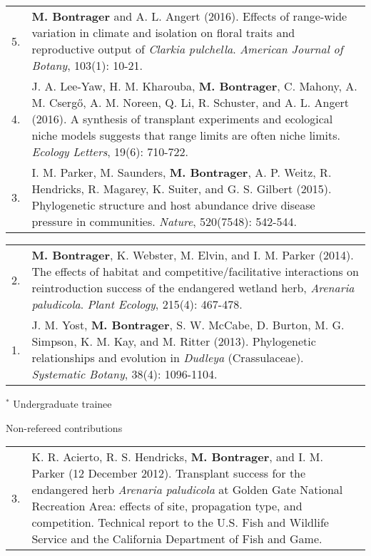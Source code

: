 \documentclass[letterpaper,11pt,oneside]{article}
\begin{document}
\begin{tabular}{@{} p{0.5cm} >{\raggedright\arraybackslash}p{16.7cm}}
5. & \textbf{M. Bontrager} and A. L. Angert (2016). Effects of range-wide variation in climate and isolation on floral traits and reproductive output of \textit{Clarkia pulchella}. \textit{American Journal of Botany}, 103(1): 10-21.  \\
4. & J. A. Lee-Yaw, H. M. Kharouba, \textbf{M. Bontrager}, C. Mahony, A. M. Cserg{\H{o}}, A. M. Noreen, Q. Li, R. Schuster, and A. L. Angert (2016). A synthesis of transplant experiments and ecological niche models suggests that range limits are often niche limits. \textit{Ecology Letters}, 19(6): 710-722. \\
3. & I. M. Parker, M. Saunders, \textbf{M. Bontrager}, A. P. Weitz, R. Hendricks, R. Magarey, K. Suiter, and G. S. Gilbert (2015). Phylogenetic structure and host abundance drive disease pressure in communities. \textit{Nature}, 520(7548): 542-544. \\
\end{tabular}
\noindent \begin{tabular}{@{} p{0.5cm} >{\raggedright\arraybackslash}p{16.7cm}}
2. & \textbf{M. Bontrager}, K. Webster, M. Elvin, and I. M. Parker (2014). The effects of habitat and competitive/facilitative interactions on reintroduction success of the endangered wetland herb, \textit{Arenaria paludicola}. \textit{Plant Ecology}, 215(4): 467-478. \\
1. & J. M. Yost, \textbf{M. Bontrager}, S. W. McCabe, D. Burton, M. G. Simpson, K. M. Kay, and M. Ritter (2013). Phylogenetic relationships and evolution in \textit{Dudleya} (Crassulaceae). \textit{Systematic Botany}, 38(4): 1096-1104. \\
\end{tabular}

\smallskip
\noindent $^{*}$ Undergraduate trainee

\bigskip





\noindent\Large{Non-refereed contributions}  
\normalsize
\medskip

\def\arraystretch{1.4}
\noindent \begin{tabular}{@{} p{0.5cm} >{\raggedright\arraybackslash}p{16.7cm}}
3. & K. R. Acierto, R. S. Hendricks, \textbf{M. Bontrager}, and I. M. Parker (12 December 2012). Transplant success for the endangered herb \textit{Arenaria paludicola} at Golden Gate National Recreation Area: effects of site, propagation type, and competition. Technical report to the U.S. Fish and Wildlife Service and the California Department of Fish and Game. \\
\end{tabular}
\end{document}
